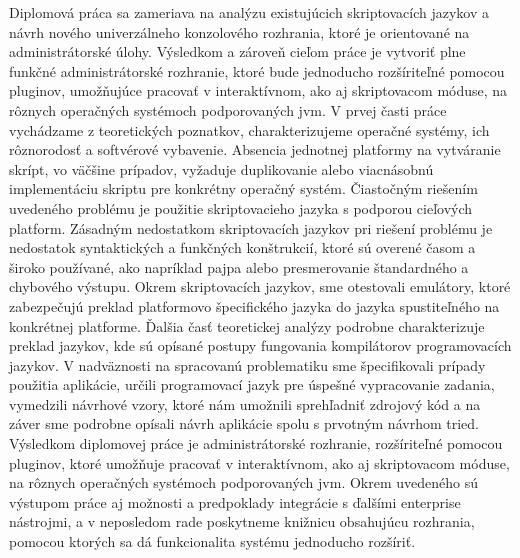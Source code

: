 \indent  Diplomová práca sa zameriava na analýzu existujúcich skriptovacích jazykov a návrh nového univerzálneho konzolového rozhrania, ktoré je orientované na administrátorské úlohy. Výsledkom a zároveň cieľom práce je vytvoriť plne funkčné administrátorské rozhranie, ktoré bude jednoducho rozšíriteľné pomocou pluginov, umožňujúce pracovať v interaktívnom, ako aj skriptovacom móduse, na rôznych operačných systémoch podporovaných \acrshort{jvm}.
\newline
\indent  V prvej časti práce vychádzame z teoretických poznatkov, charakterizujeme operačné systémy, ich rôznorodosť a softvérové vybavenie. Absencia jednotnej platformy na vytváranie skrípt, vo väčšine prípadov, vyžaduje duplikovanie alebo viacnásobnú implementáciu skriptu pre konkrétny operačný systém. Čiastočným riešením uvedeného problému je použitie skriptovacieho jazyka s podporou cieľových platform. Zásadným nedostatkom skriptovacích jazykov pri riešení problému je nedostatok syntaktických a funkčných konštrukcií, ktoré sú overené časom a široko používané, ako napríklad pajpa alebo presmerovanie štandardného a chybového výstupu. Okrem skriptovacích jazykov, sme otestovali emulátory, ktoré zabezpečujú preklad platformovo špecifického jazyka do jazyka spustiteľného na konkrétnej platforme. Ďalšia časť teoretickej analýzy podrobne charakterizuje preklad jazykov, kde sú opísané postupy fungovania kompilátorov programovacích jazykov. V nadväznosti na spracovanú problematiku sme špecifikovali prípady použitia aplikácie, určili programovací jazyk pre úspešné vypracovanie zadania, vymedzili návrhové vzory, ktoré nám umožnili sprehľadniť zdrojový kód a na záver sme podrobne opísali návrh aplikácie spolu s prvotným návrhom tried. 
\newline
\indent Výsledkom diplomovej práce je administrátorské rozhranie, rozšíriteľné pomocou pluginov, ktoré umožňuje pracovať v interaktívnom, ako aj skriptovacom móduse, na rôznych operačných systémoch podporovaných \acrshort{jvm}. Okrem uvedeného sú výstupom práce aj možnosti a predpoklady integrácie s ďalšími enterprise nástrojmi, a v neposledom rade poskytneme knižnicu obsahujúcu rozhrania, pomocou ktorých sa dá funkcionalita systému jednoducho rozšíriť.